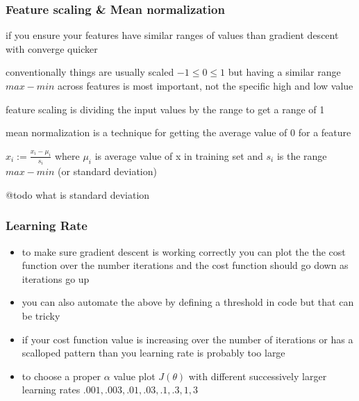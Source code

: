 \documentclass[11pt]{article}
\begin{document}
\subsubsection{Feature scaling \& Mean normalization}
\label{sec:orga238f5f}
\begin{description}
\item[{why?}] if you ensure your features have similar ranges of values than
gradient descent with converge quicker
\item conventionally things are usually scaled \(-1\leq0\leq1\) but having
a similar range \(max-min\) across features is most important, not
the specific high and low value
\item feature scaling is dividing the input values by the range to get a range of 1
\item mean normalization is a technique for getting the average value of 0 for a feature
\item[{combining mean normalization \& feature scaling}] \(x_{i}:=\frac{x_{i}-\mu_{i}}{s_{i}}\)
where \(\mu_{i}\) is average value of x in training set and \(s_{i}\) is the range \(max-min\) (or standard deviation)
\item @todo what is standard deviation
\end{description}
\subsubsection{Learning Rate}
\label{sec:org66109eb}
\begin{itemize}
\item to make sure gradient descent is working correctly you can plot the
the cost function over the number iterations and the cost function
should go down as iterations go up
\item you can also automate the above by defining a threshold in code but
that can be tricky
\item if your cost function value is increasing over the number of
iterations or has a scalloped pattern than you learning rate is
probably too large
\item to choose a proper \(\alpha\) value plot \(J(\theta)\) with different successively larger learning rates \(.001, .003, .01, .03, .1, .3, 1, 3\)
\end{itemize}
\end{document}
